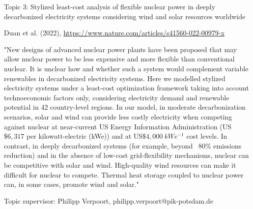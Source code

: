\documentclass[10pt,aspectratio=169,dvipsnames]{beamer}
\begin{document}
\begin{frame}
  \begin{block}{Topic 3: Stylized least-cost analysis of flexible nuclear power in deeply decarbonized electricity systems considering wind and solar resources worldwide}
      
    Duan et al. (2022), 
    \href{https://www.nature.com/articles/s41560-022-00979-x}{https://www.nature.com/articles/s41560-022-00979-x}
    
    "New designs of advanced nuclear power plants have been proposed that may allow nuclear power to be less expensive and more flexible than conventional nuclear. It is unclear how and whether such a system would complement variable renewables in decarbonized electricity systems. Here we modelled stylized electricity systems under a least-cost optimization framework taking into account technoeconomic factors only, considering electricity demand and renewable potential in 42 country-level regions. In our model, in moderate decarbonization scenarios, solar and wind can provide less costly electricity when competing against nuclear at near-current US Energy Information Administration (US$\$6,317$ per kilowatt-electric (kWe)) and at US$\$4,000~kWe^{-1}$ cost levels. In contrast, in deeply decarbonized systems (for example, beyond ~80\% emissions reduction) and in the absence of low-cost grid-flexibility mechanisms, nuclear can be competitive with solar and wind. High-quality wind resources can make it difficult for nuclear to compete. Thermal heat storage coupled to nuclear power can, in some cases, promote wind and solar." 

    \hfill
    Topic supervisor: Philipp Verpoort, philipp.verpoort@pik-potsdam.de
    
  \end{block}
\end{frame}
\end{document}
